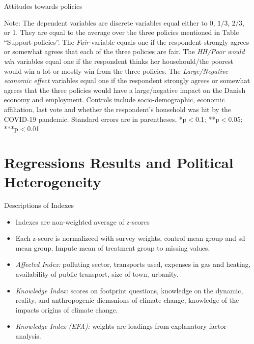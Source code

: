 \documentclass[aspectratio=169,9pt,dvipsnames]{beamer}
\begin{document}
\begin{frame}{}%
\begin{table}[h!]
\caption{Attitudes towards policies}
\begin{center}
\scalebox{.7}{}
\end{center}
	{\scriptsize Note: The dependent variables are discrete variables equal either to 0, $1/3$, $2/3$, or 1. They are equal to the average over the three policies mentioned in Table ``Support policies''. The \textit{Fair} variable equals one if the respondent strongly agrees or somewhat agrees that each of the three policies are fair. The \textit{HH/Poor would win} variables equal one if the respondent thinks her househould/the poorest would win a lot or mostly win from the three policies. The \textit{Large/Negative economic effect} variables equal one if the respondent strongly agrees or somewhat agrees that the three policies would have a large/negative impact on the Danish economy and employment. 
	\newline Controls include socio-demographic, economic affiliation, last vote and whether the respondent's household was hit by the COVID-19 pandemic. Standard errors are in parentheses. *p$<$0.1; **p$<$0.05; ***p$<$0.01}
\end{table}
\end{frame}

\section{Regressions Results and Political Heterogeneity}

\begin{frame}{Descriptions of Indexes}
\begin{itemize}
  \item Indexes are non-weighted average of z-scores
  \item Each z-score is normalizeed with survey weights, control mean group and sd mean group. Impute mean of treatment group to missing values.
  \item \textit{Affected Index:} polluting sector, transports used, expenses in gas and heating, availability of public transport, size of town, urbanity.
  \item \textit{Knowledge Index:} scores on footprint questions, knowledge on the dynamic, reality, and anthropogenic diemsnions of climate change, knowledge of the impacts origins of climate change.
  \item \textit{Knowledge Index (EFA):} weights are loadings from explanatory factor analysis.
\end{itemize}
\end{frame}
\end{document}
